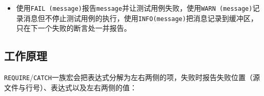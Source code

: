 \begin{itemize}

\begin{codeblockbg}
\begin{Verbatim}[commandchars=\\\{\},breaklines=true,breakanywhere=true,fontsize=\codefont,xleftmargin=17bp]
\PYG{n}{std}\PYG{o}{:}\PYG{o}{:}\PYG{n}{string}\PYG{+w}{ }\PYG{n}{text}\PYG{+w}{ }\PYG{o}{=}\PYG{+w}{ }\PYG{l+s}{\PYGZdq{}}\PYG{l+s}{this is an example}\PYG{l+s}{\PYGZdq{}}\PYG{p}{;}
\PYG{n}{CHECK\PYGZus{}THAT}\PYG{p}{(}\PYG{n}{text}\PYG{p}{,}
\PYG{+w}{  }\PYG{n}{Catch}\PYG{o}{:}\PYG{o}{:}\PYG{n}{Matchers}\PYG{o}{:}\PYG{o}{:}\PYG{n}{Contains}\PYG{p}{(}\PYG{l+s}{\PYGZdq{}}\PYG{l+s}{EXAMPLE}\PYG{l+s}{\PYGZdq{}}\PYG{p}{,}\PYG{+w}{ }\PYG{n}{Catch}\PYG{o}{:}\PYG{o}{:}\PYG{n}{CaseSensitive}\PYG{o}{:}\PYG{o}{:}\PYG{n}{No}\PYG{p}{)}\PYG{p}{)}\PYG{p}{;}
\PYG{n}{REQUIRE\PYGZus{}THAT}\PYG{p}{(}\PYG{n}{text}\PYG{p}{,}
\PYG{+w}{  }\PYG{n}{Catch}\PYG{o}{:}\PYG{o}{:}\PYG{n}{Matchers}\PYG{o}{:}\PYG{o}{:}\PYG{n}{StartsWith}\PYG{p}{(}\PYG{l+s}{\PYGZdq{}}\PYG{l+s}{this}\PYG{l+s}{\PYGZdq{}}\PYG{p}{)}\PYG{+w}{ }\PYG{o}{\PYGZam{}}\PYG{o}{\PYGZam{}}
\PYG{+w}{  }\PYG{n}{Catch}\PYG{o}{:}\PYG{o}{:}\PYG{n}{Matchers}\PYG{o}{:}\PYG{o}{:}\PYG{n}{Contains}\PYG{p}{(}\PYG{l+s}{\PYGZdq{}}\PYG{l+s}{an}\PYG{l+s}{\PYGZdq{}}\PYG{p}{)}\PYG{p}{)}\PYG{p}{;}
\end{Verbatim}
\end{codeblockbg}



\item 使用\texttt{FAIL (\allowbreak{}message)}报告\texttt{message}并让测试用例失败，使用\texttt{WARN (\allowbreak{}message)}记录消息但不停止测试用例的执行，使用\texttt{INFO(\allowbreak{}message)}把消息记录到缓冲区，只在下一个失败的断言处一并报告。

\end{itemize}



\subsection{工作原理}



\texttt{REQUIRE}/\texttt{CATCH}一族宏会把表达式分解为左右两侧的项，失败时报告失败位置（源文件与行号）、表达式以及左右两侧的值：



